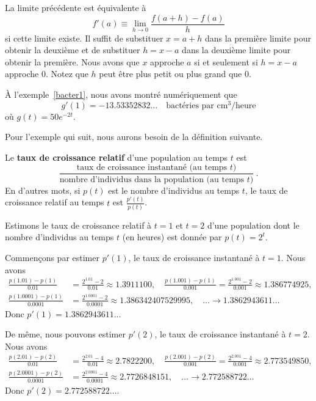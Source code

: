 {\begin{focus}{\dfn}
La limite précédente est équivalente à
\[
f'(a) \equiv \lim_{h\rightarrow 0} \frac{f(a+h) - f(a)}{h}
\]
si cette limite existe.  Il suffit de substituer $x=a+h$ dans la
première limite pour obtenir la deuxième et de substituer $h=x-a$ dans
la deuxième limite pour obtenir la première.  Nous avons que $x$
approche $a$ si et seulement si $h=x-a$ approche $0$.  Notez que $h$
peut être plus petit ou plus grand que $0$.
\end{focus}

\begin{egg}
À l'exemple~\ref{bacter1}, nous avons montré numériquement que
\[
g'(1) = -13.53352832\ldots \quad \text{bactéries par cm$^3$/heure}
\]
où $g(t) = 50 e^{-2t}$.
\end{egg}

Pour l'exemple qui suit, nous aurons besoin de la définition suivante.

\begin{focus}{\dfn} 
Le {\bfseries taux de croissance relatif} d'une population au temps
$t$ est
\[
\frac{\text{taux de croissance instantané (au temps $t$)}}
{\text{nombre d'individus dans la population (au temps $t$)}}
\ .
\]
En d'autres mots, si $p(t)$ est le nombre d'individus au temps $t$, le
taux de croissance relatif au temps $t$ est
$\displaystyle \frac{p'(t)}{p(t)}$.
\end{focus}

\begin{egg}
Estimons le taux de croissance relatif à $t=1$ et $t=2$ d'une
population dont le nombre d'individus au temps $t$ (en heures) est
donnée par $p(t) = 2^t$.

Commençons par estimer $p'(1)$, le taux de croissance instantané à
$t=1$.  Nous avons
\begin{align*}
\frac{p(1.01)-p(1)}{0.01} &= \frac{2^{1.01} - 2}{0.01} \approx 1.3911100,
\quad \frac{p(1.001)-p(1)}{0.001} = \frac{2^{1.001} - 2}{0.001} \approx
1.386774925, \\
\frac{p(1.0001)-p(1)}{0.0001} &= \frac{2^{1.0001} - 2}{0.0001} \approx
1.386342407529995, \quad \ldots 
\to 1.3862943611\ldots
\end{align*}
Donc $p'(1)=1.3862943611\ldots$

De même, nous pouvons estimer $p'(2)$, le taux de croissance instantané à
$t=2$.  Nous avons
\begin{align*}
\frac{p(2.01)-p(2)}{0.01} &= \frac{2^{2.01} - 4}{0.01} \approx 2.7822200,
\quad \frac{p(2.001)-p(2)}{0.001} = \frac{2^{2.001} - 4}{0.001} \approx
2.773549850, \\
\frac{p(2.0001)-p(2)}{0.0001} &= \frac{2^{2.0001} - 4}{0.0001} \approx
2.7726848151 , \quad \ldots 
\to 2.772588722\ldots
\end{align*}
Donc $p'(2) = 2.772588722\ldots$.


\end{egg}}
